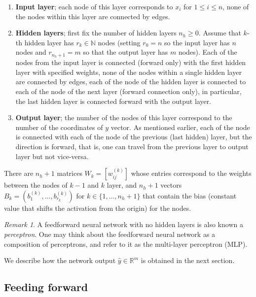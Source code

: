 \documentclass[12pt]{amsart}
\theoremstyle{remark}
\newtheorem{remark}[theorem]{Remark}
\theoremstyle{definition}
\numberwithin{equation}{section}
\begin{document}
\begin{enumerate}
	\item \textbf{Input layer}; each node of this layer corresponds to $x_i$ for $1 \leq i \leq n$, none of the nodes within this layer are connected by edges. 
	\item \textbf{Hidden layers}; first fix the number of hidden layers $n_h \geq 0$. Assume that $k$-th hidden layer has $r_k \in \mathbb{N}$ nodes (setting $r_0 = n$ so the input layer has $n$ nodes and $r_{n_h +1} = m$ so that the output layer has $m$ nodes). Each of the nodes from the input layer is connected (forward only) with the first hidden layer with specified weights, none of the nodes within a single hidden layer are connected by edges, each of the node of the hidden layer is connected to each of the node of the next layer (forward connection only), in particular, the last hidden layer is connected forward with the output layer. 
	\item \textbf{Output layer}; the number of the nodes of this layer correspond to the number of the coordinates of $y$ vector. As mentioned earlier, each of the node is connected with each of the node of the previous (last hidden) layer, but the direction is forward, that is, one can travel from the previous layer to output layer but not vice-versa.   
\end{enumerate} 

There are $n_h+1$ matrices $W_{k}= [w_{ij}^{(k)}]$ whose entries correspond to the weights between the nodes of $k-1$ and $k$ layer, and $n_h+1$ vectors $B_k= (b_1^{(k)}, \ldots, b_{r_k}^{(k)})$ for $k \in \{1, \ldots, n_h+1\}$ that contain the bias (constant value that shifts the activation from the origin) for the nodes. 

\begin{remark}
A feedforward neural network with no hidden layers is also known a \emph{perceptron}. One may think about the feedforward neural network as a composition of perceptrons, and refer to it as the multi-layer perceptron (MLP).  
\end{remark}

We describe how the network output $\widehat{y} \in \mathbb{R}^m$ is obtained in the next section. 
\subsection{Feeding forward}
\end{document}
